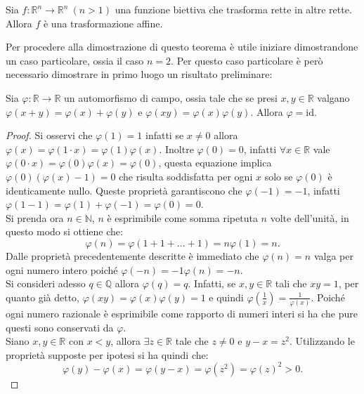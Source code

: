 \begin{thm}
Sia $f:\mathbb{R}^n\rightarrow\mathbb{R}^n\ (n>1)$ una funzione biettiva che trasforma rette in altre rette. Allora $f$ è una trasformazione affine. 
\label{thm:LinGenMain}
\end{thm}
Per procedere alla dimostrazione di questo teorema è utile iniziare dimostrandone un caso particolare, ossia il caso $n=2$. Per questo caso particolare è però necessario dimostrare in primo luogo un risultato preliminare:
\begin{prop}
	Sia $\varphi:\mathbb{R}\rightarrow\mathbb{R}$ un automorfismo di campo, ossia tale che se presi $x,y\in \mathbb{R}$ valgano $\varphi(x+y)=\varphi(x)+\varphi(y)$ e $\varphi(xy)=\varphi(x)\varphi(y)$.
	Allora $\varphi=\text{id}$.
\end{prop}	
\begin{proof}
	Si osservi che $\varphi(1)=1$ infatti se $x\neq0$ allora $\varphi(x)=\varphi(1\cdot x)=\varphi(1)\varphi(x)$. Inoltre $\varphi(0)=0$, infatti $\forall x\in\mathbb{R}$ vale $\varphi(0\cdot x)=\varphi(0)\varphi(x)=\varphi(0)$, questa equazione implica $\varphi(0)(\varphi(x)-1)=0$ che risulta soddisfatta per ogni $x$ solo se $\varphi(0)$ è identicamente nullo. Queste proprietà garantiscono che $\varphi(-1)=-1$, infatti $\varphi(1-1)=\varphi(1)+\varphi(-1)=\varphi(0)=0$.\\
	Si prenda ora $n\in\mathbb{N}$, $n$ è esprimibile come somma ripetuta $n$ volte dell'unità, in questo modo si ottiene che:
	\begin{equation*}
		\varphi(n)=\varphi(1+1+...+1)=n\varphi(1)=n.
	\end{equation*}
	Dalle proprietà precedentemente descritte è immediato che $\varphi(n)=n$ valga per ogni numero intero poiché $\varphi(-n)=-1\varphi(n)=-n$.\\
	Si consideri adesso $q\in \mathbb{Q}$ allora $\varphi(q)=q$. Infatti, se $x,y\in\mathbb{R}$ tali che $xy=1$, per quanto già detto, $\varphi(xy)=\varphi(x)\varphi(y)=1$ e quindi $\varphi(\frac{1}{x})=\frac{1}{\varphi(x)}$. Poiché ogni numero razionale è esprimibile come rapporto di numeri interi si ha che pure questi sono conservati da $\varphi$.\\
	Siano $x,y\in \mathbb{R}$ con $x<y$, allora $\exists z\in\mathbb{R}$ tale che $z\neq0$ e $y-x=z^2$. Utilizzando le proprietà supposte per ipotesi si ha quindi che:
	\begin{equation*}
		\varphi(y)-\varphi(x)=\varphi(y-x)=\varphi(z^2)=\varphi(z)^2>0.
	\end{equation*}

\end{proof}
